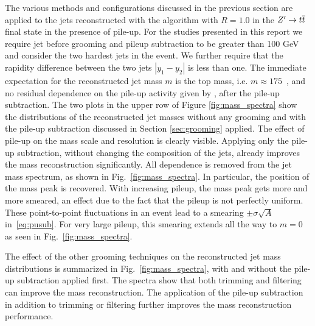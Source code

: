 The various methods and configurations discussed in the previous
section are applied to the jets reconstructed with the \antikt{}
algorithm with $R = 1.0$ in the $Z' \to t\overline{t}$ final state in
the presence of pile-up. For the studies presented in this report we require
jet \pT{} before grooming and pileup subtraction to be greater than 100
GeV and consider the two hardest \pT jets in the event. We further
require that the rapidity difference between the two jets $|y_1 -
y_2|$ is less than one.
%
The immediate expectation for the reconstructed jet mass $m$ is the
top mass, i.e. $m \approx 175$~\GeV, and no residual dependence on the
pile-up activity given by \axing, after the pile-up
subtraction. The two plots in the upper row of 
Figure \ref{fig:mass_spectra} show the distributions of
the reconstructed jet masses without any grooming
 and with the pile-up subtraction discussed in Section \ref{sec:grooming} 
applied. The effect of
pile-up on the mass scale and resolution is clearly visible.
%
Applying only the pile-up subtraction, without changing
the composition of the jets, already improves the mass reconstruction
significantly. All \axing{} dependence is removed from the jet mass spectrum,
as shown in Fig.~\ref{fig:mass_spectra}. In
particular, the position of the mass peak is recovered. With
increasing pileup, the mass peak gets more and more smeared, an effect
due to the fact that the pileup is not perfectly uniform. These
point-to-point fluctuations in an event lead to a smearing $\pm
\sigma\sqrt{A}$ in~\eqref{eq:pusub}. For very large pileup, this
smearing extends all the way to $m=0$ as seen in
Fig.~\ref{fig:mass_spectra}.

The effect of the other grooming techniques on the reconstructed jet mass distributions is summarized in Fig.~\ref{fig:mass_spectra}, with and without the pile-up subtraction applied first. The spectra show that both trimming and filtering can improve the mass reconstruction. The application of the pile-up subtraction in addition to trimming or filtering further improves the mass reconstruction performance.



